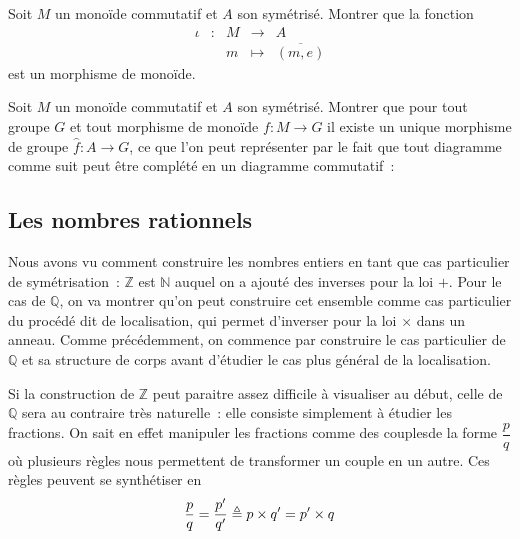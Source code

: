 \begin{exercise}
  Soit $M$ un monoïde commutatif et $A$ son symétrisé. Montrer que la fonction
  \[\begin{array}{ccccc}
  \iota & : & M & \longrightarrow & A\\
  & & m & \longmapsto & \overline{(m,e)}
  \end{array}\]
  est un morphisme de monoïde.
\end{exercise}

\begin{exercise}
  Soit $M$ un monoïde commutatif et $A$ son symétrisé. Montrer que pour tout
  groupe $G$ et tout morphisme de monoïde $f : M \to G$ il existe un unique
  morphisme de groupe $\hat f : A \to G$, ce que l'on peut représenter par le
  fait que tout diagramme comme suit peut être complété en un diagramme
  commutatif~:
  \begin{center}
  \end{center}
\end{exercise}

\subsection{Les nombres rationnels}

Nous avons vu comment construire les nombres entiers en tant que cas particulier
de symétrisation~: $\mathbb Z$ est $\mathbb N$ auquel on a ajouté des inverses
pour la loi $+$. Pour le cas de $\mathbb Q$, on va montrer qu'on peut construire
cet ensemble comme cas particulier du procédé dit de localisation, qui permet
d'inverser pour la loi $\times$ dans un anneau. Comme précédemment, on commence
par construire le cas particulier de $\mathbb Q$ et sa structure de corps avant
d'étudier le cas plus général de la localisation.

Si la construction de $\mathbb Z$ peut paraitre assez difficile à visualiser
au début, celle de $\mathbb Q$ sera au contraire très naturelle~: elle
consiste simplement à étudier les fractions. On sait en effet manipuler les
fractions comme des \og couples\fg de la forme $\dfrac{p}{q}$ où plusieurs
règles nous permettent de transformer un couple en un autre. Ces règles peuvent
se synthétiser en
\[\frac{p}{q} = \frac{p'}{q'} \triangleq p\times q' = p' \times q\]

